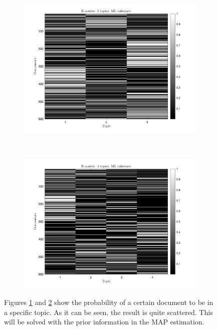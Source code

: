 \documentclass[12pt]{article}
\begin{document}
\begin{figure}[h]
	\centering
	\begin{subfigure}{0.4\textwidth}
		\includegraphics[width=\textwidth]{images/ML/R_ml_3_topics.jpg}
		\caption{}
		\label{fig:R_ML_3}
	\end{subfigure}
	~	
	\begin{subfigure}{0.4\textwidth}
		\includegraphics[width=\textwidth]{images/ML/R_ml_4_topics.jpg}
		\caption{}
		\label{fig:R_ML_4}
	\end{subfigure}
	\caption{Figures \ref{fig:R_ML_3} and \ref{fig:R_ML_4} show the probability of a certain document to be in a specific topic. As it can be seen, the result is quite scattered. This will be solved with the prior information in the MAP estimation.}
	\label{fig:R_ML}
\end{figure}
\end{document}
